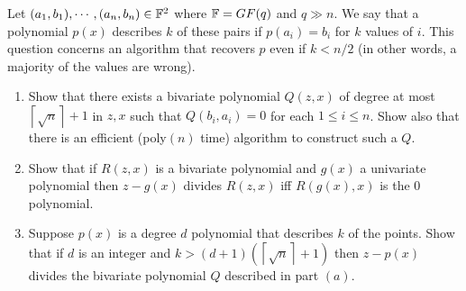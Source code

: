 \newpage
\pb
Let $(a_{1},b_{1}),\cdots,(a_{n},b_{n}) \in \mathbb{F}^{2}$ where $\mathbb{F}= GF(q)$ and $q \gg n$. We say that a polynomial $p(x)$ describes $k$ of these pairs if $p(a_{i}) = b_{i}$ for $k$ values of $i$. This question concerns an algorithm that recovers $p$ even
if $k<n/2$ (in other words, a majority of the values are wrong).
\begin{enumerate}[leftmargin=*, label=(\alph*)]
\item Show that there exists a bivariate polynomial $Q(z,x)$ of degree at most $\left\lceil\sqrt n\right\rceil+1$ in $z,x$ such that $Q(b_{i},a_{i}) = 0$ for each $1\le i\le n$. Show also that there is an efficient (poly$(n)$ time) algorithm to construct such a $Q$.
\item Show that if $R(z,x)$ is a bivariate polynomial and $g(x)$ a univariate polynomial then $z-g(x)$ divides $R(z,x)$ iff $R(g(x),x)$ is the $0$ polynomial.
\item Suppose $p(x)$ is a degree $d$ polynomial that describes $k$ of the points. Show that if $d$ is an integer and $k>(d+1)\left(\left\lceil\sqrt n\right\rceil+1\right)$ then $z-p(x)$ divides the bivariate polynomial $Q$ described in part $(a)$.
\end{enumerate}


\soln

